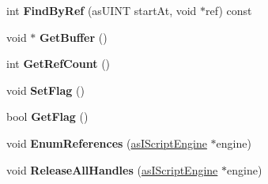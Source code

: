 \begin{DoxyCompactItemize}
int {\bfseries Find\+By\+Ref} (as\+U\+I\+NT start\+At, void $\ast$ref) const
\item 
\mbox{\label{class_c_script_array_a098920427fa8395f8826ac1146e608dd}} 
void $\ast$ {\bfseries Get\+Buffer} ()
\item 
\mbox{\label{class_c_script_array_a0930872210110d97174b9e731dcd9223}} 
int {\bfseries Get\+Ref\+Count} ()
\item 
\mbox{\label{class_c_script_array_a7a5bb10b3f4ed45a19e3e4af92cee03e}} 
void {\bfseries Set\+Flag} ()
\item 
\mbox{\label{class_c_script_array_aca4e57f9d07233882048f83665a22317}} 
bool {\bfseries Get\+Flag} ()
\item 
\mbox{\label{class_c_script_array_ac2fbae4819e642ff82c8b31439e17cb2}} 
void {\bfseries Enum\+References} (\hyperlink{classas_i_script_engine}{as\+I\+Script\+Engine} $\ast$engine)
\item 
\mbox{\label{class_c_script_array_acf0576a959d4710c35a7073046748de7}} 
void {\bfseries Release\+All\+Handles} (\hyperlink{classas_i_script_engine}{as\+I\+Script\+Engine} $\ast$engine)
\end{DoxyCompactItemize}
